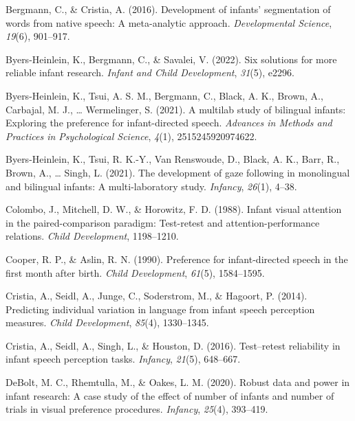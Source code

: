 \documentclass[
  man,floatsintext]{apa6}
\newlength{\cslhangindent}
\newlength{\cslentryspacingunit} %
\newenvironment{CSLReferences}[2] %
 {%
  \setlength{\parindent}{0pt}
  \ifodd #1
  \let\oldpar\par
  \def\par{\hangindent=\cslhangindent\oldpar}
  \fi
  \setlength{\parskip}{#2\cslentryspacingunit}
 }%
 {}
\begin{document}
\hypertarget{refs}{}
\begin{CSLReferences}{1}{0}
\leavevmode{}%
Bergmann, C., \& Cristia, A. (2016). Development of infants' segmentation of words from native speech: A meta-analytic approach. \emph{Developmental Science}, \emph{19}(6), 901--917.

\leavevmode{}%
Byers-Heinlein, K., Bergmann, C., \& Savalei, V. (2022). Six solutions for more reliable infant research. \emph{Infant and Child Development}, \emph{31}(5), e2296.

\leavevmode{}%
Byers-Heinlein, K., Tsui, A. S. M., Bergmann, C., Black, A. K., Brown, A., Carbajal, M. J., \ldots{} Wermelinger, S. (2021). A multilab study of bilingual infants: Exploring the preference for infant-directed speech. \emph{Advances in Methods and Practices in Psychological Science}, \emph{4}(1), 2515245920974622.

\leavevmode{}%
Byers-Heinlein, K., Tsui, R. K.-Y., Van Renswoude, D., Black, A. K., Barr, R., Brown, A., \ldots{} Singh, L. (2021). The development of gaze following in monolingual and bilingual infants: A multi-laboratory study. \emph{Infancy}, \emph{26}(1), 4--38.

\leavevmode{}%
Colombo, J., Mitchell, D. W., \& Horowitz, F. D. (1988). Infant visual attention in the paired-comparison paradigm: Test-retest and attention-performance relations. \emph{Child Development}, 1198--1210.

\leavevmode{}%
Cooper, R. P., \& Aslin, R. N. (1990). Preference for infant-directed speech in the first month after birth. \emph{Child Development}, \emph{61}(5), 1584--1595.

\leavevmode{}%
Cristia, A., Seidl, A., Junge, C., Soderstrom, M., \& Hagoort, P. (2014). Predicting individual variation in language from infant speech perception measures. \emph{Child Development}, \emph{85}(4), 1330--1345.

\leavevmode{}%
Cristia, A., Seidl, A., Singh, L., \& Houston, D. (2016). Test--retest reliability in infant speech perception tasks. \emph{Infancy}, \emph{21}(5), 648--667.

\leavevmode{}%
DeBolt, M. C., Rhemtulla, M., \& Oakes, L. M. (2020). Robust data and power in infant research: A case study of the effect of number of infants and number of trials in visual preference procedures. \emph{Infancy}, \emph{25}(4), 393--419.


\end{CSLReferences}
\end{document}
